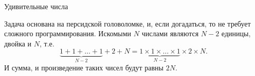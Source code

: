 \begin{tutorial}{Удивительные числа}

Задача основана на персидской головоломке, и, если догадаться, то не требует сложного программирования. Искомыми $N$ числами являются $N-2$ единицы, двойка и $N$, т.е.
$$
\underbrace{1 + 1 + \dots + 1}_{N-2} + 2 + N =\underbrace{1 \times 1 \times \dots \times 1}_{N-2} \times 2 \times N.
$$
И сумма, и произведение таких чисел будут равны $2N$.

\end{tutorial}
